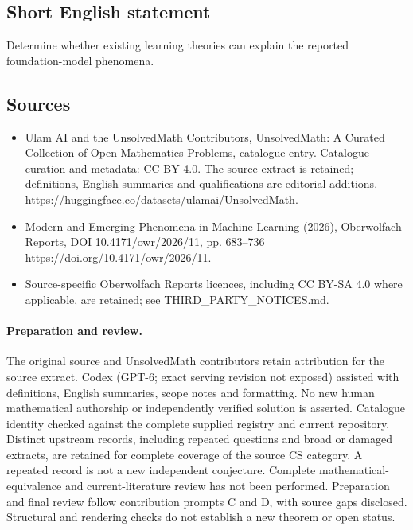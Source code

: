 \documentclass[11pt]{article}
\begin{document}
\subsection{Short English statement}
Determine whether existing learning theories can explain the reported foundation-model phenomena.
\subsection{Sources}
\begin{itemize}
\item[\hypertarget{source:statement:1}{S1}] Ulam AI and the UnsolvedMath Contributors, UnsolvedMath: A Curated Collection of Open Mathematics Problems, catalogue entry. Catalogue curation and metadata: CC BY 4.0. The source extract is retained; definitions, English summaries and qualifications are editorial additions.
\url{https://huggingface.co/datasets/ulamai/UnsolvedMath}.
\item[\hypertarget{source:statement:2}{S2}] Modern and Emerging Phenomena in Machine Learning (2026), Oberwolfach Reports, DOI 10.4171/owr/2026/11, pp. 683--736
\url{https://doi.org/10.4171/owr/2026/11}.
\item Source-specific Oberwolfach Reports licences, including CC BY-SA 4.0 where applicable, are retained; see THIRD\_PARTY\_NOTICES.md.
\end{itemize}
\paragraph{Preparation and review.}
The original source and UnsolvedMath contributors retain attribution for the source extract. Codex (GPT-6; exact serving revision not exposed) assisted with definitions, English summaries, scope notes and formatting. No new human mathematical authorship or independently verified solution is asserted. Catalogue identity checked against the complete supplied registry and current repository. Distinct upstream records, including repeated questions and broad or damaged extracts, are retained for complete coverage of the source CS category. A repeated record is not a new independent conjecture. Complete mathematical-equivalence and current-literature review has not been performed. Preparation and final review follow contribution prompts C and D, with source gaps disclosed. Structural and rendering checks do not establish a new theorem or open status.
\label{end:statement}
\end{document}
